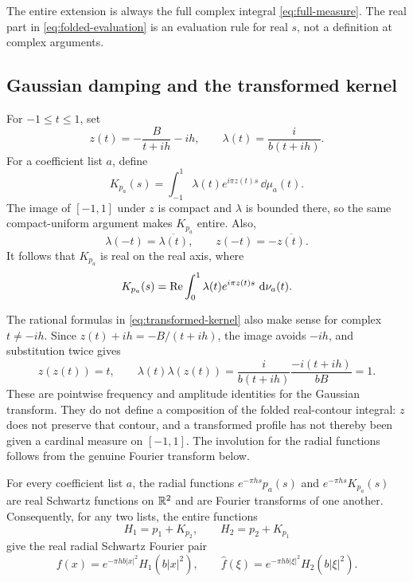 The entire extension is always the full complex integral
\eqref{eq:full-measure}.  The real part in \eqref{eq:folded-evaluation} is an
evaluation rule for real \(s\), not a definition at complex arguments.

\subsection{Gaussian damping and the transformed kernel}

For \(-1\le t\le1\), set
\begin{equation}\label{eq:transformed-kernel}
 z(t)=-\frac{B}{t+ih}-ih,\qquad
 \lambda(t)=\frac{i}{b(t+ih)}.
\end{equation}
For a coefficient list \(a\), define
\begin{equation}\label{eq:transformed-function}
 K_{p_a}(s)=\int_{-1}^1\lambda(t)e^{i\pi z(t)s}\,\dd\mu_a(t).
\end{equation}
The image of \([-1,1]\) under \(z\) is compact and \(\lambda\) is bounded
there, so the same compact-uniform argument makes \(K_{p_a}\) entire.  Also,
\[
 \lambda(-t)=\overline{\lambda(t)},\qquad
 z(-t)=-\overline{z(t)}.
\]
It follows that \(K_{p_a}\) is real on the real axis, where
\begin{equation}\label{eq:folded-transformed-function}
 K_{p_a}(s)=\operatorname{Re}\int_0^1
                   \lambda(t)e^{i\pi z(t)s}\,\mathop{}\!\mathrm d\nu_a(t).
\end{equation}

\begin{remark}
The rational formulas in \eqref{eq:transformed-kernel} also make sense for
complex \(t\ne-ih\).  Since \(z(t)+ih=-B/(t+ih)\), the image avoids \(-ih\),
and substitution twice gives
\[
 z(z(t))=t,\qquad
 \lambda(t)\lambda(z(t))
 =\frac{i}{b(t+ih)}\frac{-i(t+ih)}{bB}=1.
\]
These are pointwise frequency and amplitude identities for the Gaussian
transform.  They do not define a composition of the folded real-contour
integral: \(z\) does not preserve that contour, and a transformed profile has
not thereby been given a cardinal measure on \([-1,1]\).  The involution for
the radial functions follows from the genuine Fourier transform below.
\end{remark}

\begin{lemma}\label{lem:fourier-pair}
For every coefficient list \(a\), the radial functions
\(e^{-\pi hs}p_a(s)\) and \(e^{-\pi hs}K_{p_a}(s)\) are real Schwartz
functions on \(\mathbb R^2\) and are Fourier transforms of one another.
Consequently, for any two lists, the entire functions
\begin{equation}\label{eq:coupled-pair}
 H_1=p_1+K_{p_2},\qquad H_2=p_2+K_{p_1}
\end{equation}
give the real radial Schwartz Fourier pair
\[
 f(x)=e^{-\pi hb|x|^2}H_1(b|x|^2),\qquad
 \widehat f(\xi)=e^{-\pi hb|\xi|^2}H_2(b|\xi|^2).
\]
\end{lemma}

